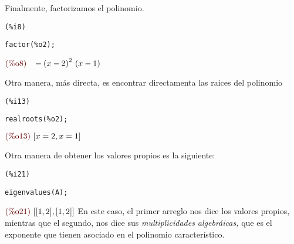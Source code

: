 \begin{sol}
Finalmente, factorizamos el polinomio.
\noindent
\begin{minipage}[t]{8ex}{\color{red}\bf
\begin{verbatim}
(%i8)
\end{verbatim}}
\end{minipage}
\begin{minipage}[t]{\textwidth}{\color{blue}
\begin{verbatim}
factor(%o2);
\end{verbatim}}
\end{minipage}
\begin{math}\displaystyle
\parbox{8ex}{\color{labelcolor}(\%o8) }
-{\left( x-2\right) }^{2}\,\left( x-1\right)
\end{math}

Otra manera, más directa, es encontrar directamenta las raices del polinomio

\noindent
\begin{minipage}[t]{8ex}{\color{red}\bf
\begin{verbatim}
(%i13)
\end{verbatim}}
\end{minipage}
\begin{minipage}[t]{\textwidth}{\color{blue}
\begin{verbatim}
realroots(%o2);
\end{verbatim}}
\end{minipage}
\begin{math}\displaystyle
\parbox{8ex}{\color{labelcolor}(\%o13) }
[x=2,x=1]
\end{math}


Otra manera de obtener los valores propios es la siguiente:

\noindent
\begin{minipage}[t]{8ex}{\color{red}\bf
\begin{verbatim}
(%i21)
\end{verbatim}}
\end{minipage}
\begin{minipage}[t]{\textwidth}{\color{blue}
\begin{verbatim}
eigenvalues(A);
\end{verbatim}}
\end{minipage}
\begin{math}\displaystyle
\parbox{8ex}{\color{labelcolor}(\%o21) }
[[1,2],[1,2]]
\end{math}
En este caso, el primer arreglo nos dice los valores propios, mientras que el segundo, nos dice sus
\emph{multiplicidades algebráicas,} que es el exponente que tienen asociado en el polinomio característico.
\end{sol}

